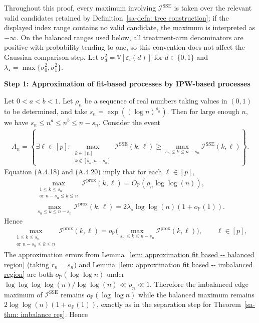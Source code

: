 \documentclass[10pt]{article}
\def\P{\mathbb{P}}
\def\V{\mathbb{V}}
\def\I{\mathscr{I}}
\theoremstyle{definition}
\theoremstyle{remark}
\begin{document}
Throughout this proof, every maximum involving $\I^{\text{SSE}}$ is taken over the relevant valid candidates retained by Definition~\ref{sa-defn: tree construction}; if the displayed index range contains no valid candidate, the maximum is interpreted as $-\infty$. On the balanced ranges used below, all treatment-arm denominators are positive with probability tending to one, so this convention does not affect the Gaussian comparison step.
Let $\sigma_d^2=\V[\varepsilon_i(d)]$ for $d\in\{0,1\}$ and
$\lambda_\star=\max\{\sigma_0^2,\sigma_1^2\}$.

\begin{center}
    \textbf{Step 1: Approximation of fit-based processes by IPW-based processes}
\end{center}

Let $0 < a < b < 1$. Let $\rho_n$ be a sequence of real numbers taking values in $(0,1)$ to be determined, and take $s_n = \exp((\log n)^{\rho_n})$. Then for large enough $n$, we have $s_n \leq n^a \leq n^b \leq n - s_n$. Consider the event 
\begin{align*}
    A_n = \left\{\exists \ell \in [p]: \max_{\substack{k \in [n]\\ k \notin [s_n,n - s_n]}} \I^\text{SSE}(k,\ell) \geq \max_{s_n \leq k \leq n - s_n} \I^\text{SSE}(k,\ell)\right\}.
\end{align*}
Equation (A.4.18) and (A.4.20) imply that for each $\ell \in [p]$,
\begin{gather*}
    \max_{\substack{1 \leq k \leq s_n\\ \text{or } n - s_n \leq k \leq n}} \I^{\text{prox}}(k,\ell) = O_\P(\rho_n \log \log(n)), \\
    \max_{s_n \leq k \leq n - s_n}\I^{\text{prox}}(k,\ell) = 2\lambda_\star \log \log (n)(1 + o_\P(1)).
\end{gather*}
Hence
\begin{align*}
    \max_{\substack{1 \leq k \leq s_n\\ \text{or } n - s_n \leq k \leq n}}\I^{\text{prox}}(k,\ell) = o_\P \bigg(\max_{s_n \leq k \leq n - s_n}\I^{\text{prox}}(k,\ell)\bigg), \qquad \ell \in [p],
\end{align*}
The approximation errors from Lemma~\ref{lem: approximation fit based -- balanced region} (taking $r_n=s_n$) and Lemma~\ref{lem: approximation fit based -- imbalanced region} are both $o_\P(\log\log n)$ under
$\log \log \log \log(n)/\log \log(n) \ll \rho_n \ll 1$. Therefore the imbalanced edge maximum of $\I^{\text{SSE}}$ remains $o_\P(\log\log n)$ while the balanced maximum remains $2\log\log(n)(1+o_\P(1))$, exactly as in the separation step for Theorem~\ref{sa-thm: imbalance reg}. Hence
\end{document}
